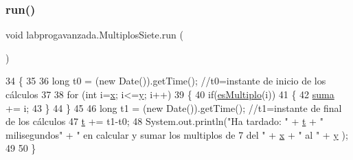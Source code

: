 \subsubsection{\texorpdfstring{run()}{run()}}
{\footnotesize\ttfamily void labprogavanzada.\+Multiplos\+Siete.\+run (\begin{DoxyParamCaption}{ }\end{DoxyParamCaption})\hspace{0.3cm}{\ttfamily [inline]}}


\begin{DoxyCode}
34                      \{
35         
36         \textcolor{keywordtype}{long} t0 = (\textcolor{keyword}{new} Date()).getTime(); \textcolor{comment}{//t0=instante de inicio de los cálculos}
37         
38         \textcolor{keywordflow}{for} (\textcolor{keywordtype}{int} i=\mbox{\hyperlink{classlabprogavanzada_1_1_multiplos_siete_a66b1e8aa9e692a515ca3b2e6a8f9e46f}{x}}; i<=\mbox{\hyperlink{classlabprogavanzada_1_1_multiplos_siete_a9e6209ca44e838aa9e618a6487f0041f}{y}}; i++)
39         \{
40             \textcolor{keywordflow}{if}(\mbox{\hyperlink{classlabprogavanzada_1_1_multiplos_siete_a586194f8ac6f470f06348ba0868f0c76}{esMultiplo}}(i))
41             \{
42                 \mbox{\hyperlink{namespacesuma}{suma}} += i;
43             \}
44         \}
45         
46         \textcolor{keywordtype}{long} t1 = (\textcolor{keyword}{new} Date()).getTime(); \textcolor{comment}{//t1=instante de final de los cálculos}
47         \mbox{\hyperlink{classlabprogavanzada_1_1_multiplos_siete_a406ca832e3291aaadc80bc4fc7cad9b0}{t}} += t1-t0;
48         System.out.println(\textcolor{stringliteral}{"Ha tardado: "} + \mbox{\hyperlink{classlabprogavanzada_1_1_multiplos_siete_a406ca832e3291aaadc80bc4fc7cad9b0}{t}} + \textcolor{stringliteral}{" milisegundos"} + \textcolor{stringliteral}{" en calcular y sumar los multiplos de 7
       del "} + \mbox{\hyperlink{classlabprogavanzada_1_1_multiplos_siete_a66b1e8aa9e692a515ca3b2e6a8f9e46f}{x}} + \textcolor{stringliteral}{" al "} + \mbox{\hyperlink{classlabprogavanzada_1_1_multiplos_siete_a9e6209ca44e838aa9e618a6487f0041f}{y}} );
49            
50     \}
\end{DoxyCode}
\mbox{\label{classlabprogavanzada_1_1_multiplos_siete_ae1e50e7a7f2e4156432a9b638b412539}} 
